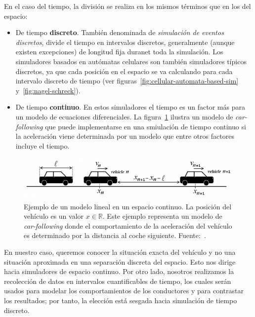 En el caso del tiempo, la división se realiza en los mismos términos que en los del espacio:

\begin{itemize}
	\item De tiempo \textbf{discreto}. También denominada de \textit{simulación de eventos discretos}, divide el tiempo en intervalos discretos, generalmente (aunque existen excepciones) de longitud fija duranet toda la simulación. Los simuladores basados en autómatas celulares son también simuladores típicos discretos, ya que cada posición en el espacio se va calculando para cada intervalo discreto de tiempo (ver figuras~\ref{fig:cellular-automata-based-sim} y~\ref{fig:nagel-schreck}).
	\item De tiempo \textbf{continuo}. En estos simuladores el tiempo es un factor más para un modelo de ecuaciones diferenciales. La figura~\ref{fig:car-following-based-sim} ilustra un modelo de \textit{car-following} que puede implementarse en una smiulación de tiempo continuo si la aceleración viene determinada por un modelo que entre otros factores incluye el tiempo.
\end{itemize}

\begin{figure}
	\centering
	\includegraphics{images/car-following-based-sim}
	\caption{Ejemplo de un modelo lineal en un espacio continuo. La posición del vehículo es un valor $x \in \mathbb{R}$. Este ejemplo representa un modelo de \textit{car-following} donde el comportamiento de la aceleración del vehículo es determinado por la distancia al coche siguiente. Fuente:~\cite{Tordeux2011}.}
	\label{fig:car-following-based-sim}
\end{figure}

En nuestro caso, queremos conocer la situación exacta del vehículo y no una situación aproximada en una separación discreta del espacio. Esto nos dirige hacia simuladores de espacio continuo. Por otro lado, nosotros realizamos la recolección de datos en intervalos cuantificables de tiempo, los cuales serán usados para modelar los comportamientos de los conductores y para contrastar los resultados; por tanto, la elección está sesgada hacia simulación de tiempo discreto.

